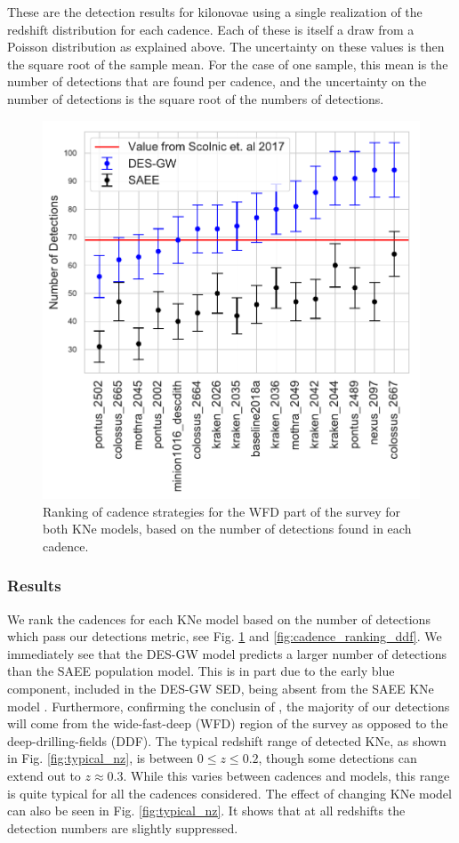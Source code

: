 These are the detection results for kilonovae using a single realization of the redshift distribution for each cadence. Each of these is itself a draw from a Poisson distribution as explained above. The uncertainty on these values is then the square root of the sample mean. For the case of one sample, this mean is the number of detections that are found per cadence, and the uncertainty on the number of detections is the square root of the numbers of detections.
\begin{figure}[h!]
  \centering
  \includegraphics[scale=0.79]{figures/wfd_detection_counts_by_cadence}
  \caption{Ranking of cadence strategies for the WFD part of the survey for both KNe models, based on the number of detections found in each cadence.}
  \label{fig:cadence_ranking}
\end{figure}
\subsubsection{Results}
We rank the cadences for each KNe model based on the number of detections which pass our detections metric, see Fig. \ref{fig:cadence_ranking} and \ref{fig:cadence_ranking_ddf}. We immediately see that the DES-GW model predicts a larger number of detections than the SAEE population model. This is in part due to the early blue component, included in the DES-GW SED, being absent from the SAEE KNe model \citep{Villar2017b}. Furthermore, confirming the conclusin of \citet{Scolnic2017a}, the majority of our detections will come from the wide-fast-deep (WFD) region of the survey as opposed to the deep-drilling-fields (DDF). The typical redshift range of detected KNe, as shown in Fig. \ref{fig:typical_nz}, is between $0 \leq z \leq 0.2$, though some detections can extend out to $z \approx 0.3$. While this varies between cadences and models, this range is quite typical for all the cadences considered. The effect of changing KNe model can also be seen in Fig. \ref{fig:typical_nz}. It shows that at all redshifts the detection numbers are slightly suppressed.

